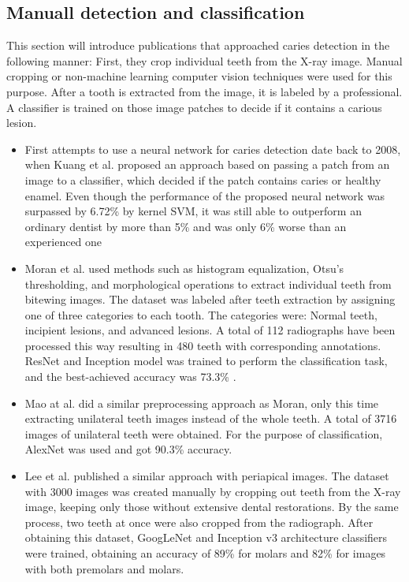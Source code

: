 \subsection{Manuall detection and classification}
This section will introduce publications that approached caries detection in the following manner: First, they crop individual teeth from the X-ray image. Manual cropping or non-machine learning computer vision techniques were used for this purpose. After a tooth is extracted from the image, it is labeled by a professional. A classifier is trained on those image patches to decide if it contains a carious lesion.
\begin{itemize}
    \item First attempts to use a neural network for caries detection date back to 2008, when Kuang et al. \cite{Kuang2008} proposed an approach based on passing a patch from an image to a classifier, which decided if the patch contains caries or healthy enamel. Even though the performance of the proposed neural network was surpassed by 6.72\% by kernel SVM, it was still able to outperform an ordinary dentist by more than 5\% and was only 6\% worse than an experienced one
    \item Moran et al.\cite{Moran2021} used methods such as histogram equalization, Otsu's thresholding, and morphological operations to extract individual teeth from bitewing images. The dataset was labeled after teeth extraction by assigning one of three categories to each tooth. The categories were: Normal teeth, incipient lesions, and advanced lesions. A total of 112 radiographs have been processed this way resulting in 480 teeth with corresponding annotations. ResNet and Inception model was trained to perform the classification task, and the best-achieved accuracy was 73.3\% \cite{Moran2021}.
    \item{Mao at al. \cite{Mao2021}} did a similar preprocessing approach as Moran, only this time extracting unilateral teeth images instead of the whole teeth. A total of 3716 images of unilateral teeth were obtained. For the purpose of classification, AlexNet was used and got 90.3\% accuracy.
    \item{Lee et al. \cite{Lee2018}} published a similar approach with periapical images. The dataset with 3000 images was created manually by cropping out teeth from the X-ray image, keeping only those without extensive dental restorations. By the same process, two teeth at once were also cropped from the radiograph. After obtaining this dataset, GoogLeNet and Inception v3 architecture classifiers were trained, obtaining an accuracy of 89\%  for molars and 82\% for images with both premolars and molars.
\end{itemize}


